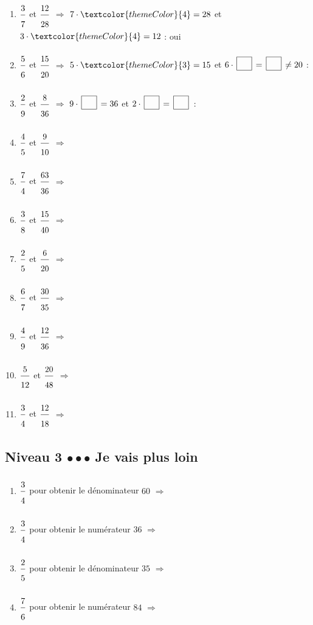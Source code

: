 \begin{enumerate}[leftmargin=*,align=parleft, label=\alph*), itemsep=9pt]
\item $\FA{3}{7}$ et $\FA{12}{28}$ \quad $\Longrightarrow$ \quad $7 \cdot \textcolor{themeColor}{4}=28$ \quad et \quad $3 \cdot \textcolor{themeColor}{4}=12$ \quad : \quad \textcolor{themeColor}{oui}
\item $\FA{5}{6}$ et $\FA{15}{20}$ \quad $\Longrightarrow$ \quad $5 \cdot \textcolor{themeColor}{3}=15$ \quad et \quad $6 \cdot \CaseC=\CaseC \ne 20$ \quad : \quad \Case
\item $\FA{2}{9}$ et $\FA{8}{36}$ \quad $\Longrightarrow$ \quad $9 \cdot \CaseC=36$ \quad et \quad $2 \cdot \CaseC=\CaseC$ \quad : \quad \Case
\item $\FA{4}{5}$ et $\FA{9}{10}$ \quad $\Longrightarrow$
\item $\FA{7}{4}$ et $\FA{63}{36}$ \quad $\Longrightarrow$
\item $\FA{3}{8}$ et $\FA{15}{40}$ \quad $\Longrightarrow$
\item $\FA{2}{5}$ et $\FA{6}{20}$ \quad $\Longrightarrow$
\item $\FA{6}{7}$ et $\FA{30}{35}$ \quad $\Longrightarrow$
\item $\FA{4}{9}$ et $\FA{12}{36}$ \quad $\Longrightarrow$
\item $\FA{5}{12}$ et $\FA{20}{48}$ \quad $\Longrightarrow$
\item $\FA{3}{4}$ et $\FA{12}{18}$ \quad $\Longrightarrow$
\end{enumerate}

\newpage
\subsection{Niveau 3 \quad $\bullet\bullet\bullet$ \quad Je vais plus loin}


\begin{enumerate}[leftmargin=*,align=parleft, label=\alph*), itemsep=9pt]
\item $\FA{3}{4}$ pour obtenir le dénominateur $60$ \quad $\Longrightarrow$
\item $\FA{3}{4}$ pour obtenir le numérateur $36$ \quad $\Longrightarrow$
\item $\FA{2}{5}$ pour obtenir le dénominateur $35$ \quad $\Longrightarrow$
\item $\FA{7}{6}$ pour obtenir le numérateur $84$ \quad $\Longrightarrow$
\end{enumerate}

